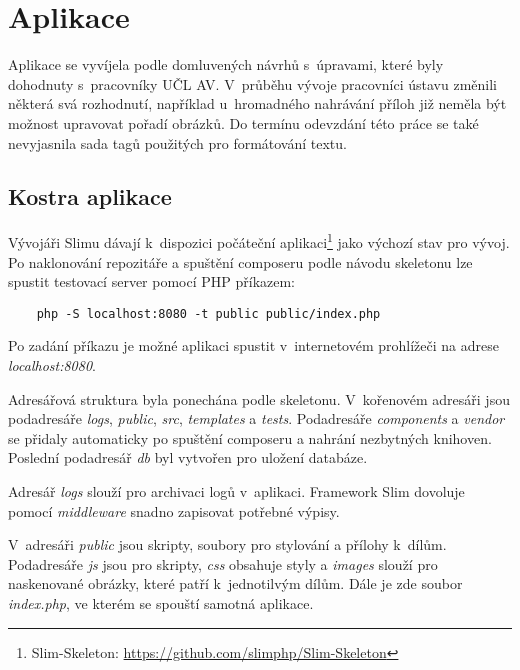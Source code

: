             
            
    \section{Aplikace}
    
        Aplikace se vyvíjela podle domluvených návrhů s~úpravami, které byly dohodnuty s~pracovníky UČL AV. V~průběhu vývoje pracovníci ústavu změnili některá svá rozhodnutí, například u~hromadného nahrávání příloh již neměla být možnost upravovat pořadí obrázků. Do termínu odevzdání této práce se také nevyjasnila sada tagů použitých pro formátování textu.
        \subsection{Kostra aplikace}
            Vývojáři Slimu dávají k~dispozici počáteční aplikaci\footnote{Slim-Skeleton: \url{https://github.com/slimphp/Slim-Skeleton}} jako výchozí stav pro vývoj. Po naklonování repozitáře a spuštění composeru podle návodu skeletonu lze spustit testovací server pomocí PHP příkazem:
            \begin{lstlisting}
    php -S localhost:8080 -t public public/index.php
            \end{lstlisting}
            Po zadání příkazu je možné aplikaci spustit v~internetovém prohlížeči na adrese \textit{localhost:8080}.
            
            Adresářová struktura byla ponechána podle skeletonu. V~kořenovém adresáři jsou podadresáře \textit{logs}, \textit{public}, \textit{src}, \textit{templates} a \textit{tests}. Podadresáře \textit{components} a \textit{vendor} se přidaly automaticky po spuštění composeru a nahrání nezbytných knihoven. Poslední podadresář \textit{db} byl vytvořen pro uložení databáze.

            Adresář \textit{logs} slouží pro archivaci logů v~aplikaci. Framework Slim dovoluje pomocí \textit{middleware} snadno zapisovat potřebné výpisy.
            
            V~adresáři \textit{public} jsou skripty, soubory pro stylování a přílohy k~dílům. Podadresáře \textit{js} jsou pro skripty, \textit{css} obsahuje styly a \textit{images} slouží pro naskenované obrázky, které patří k~jednotilvým dílům. Dále je zde soubor \textit{index.php}, ve kterém se spouští samotná aplikace.
            
